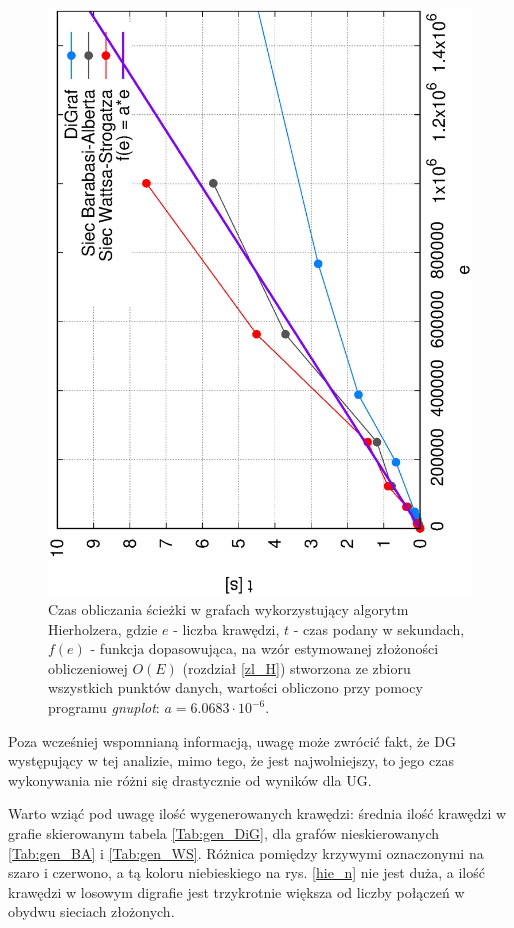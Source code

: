 \documentclass[a4paper, 12pt, twoside, openright]{article}
\begin{document}
\begin{figure}[h]
	\centering
	\includegraphics[angle=270,width=1\textwidth]{img/wyniki/Hierholzer_e}
	\caption[]{Czas obliczania ścieżki w grafach wykorzystujący algorytm Hierholzera, gdzie $e$ - liczba krawędzi, $t$ - czas podany w sekundach, $f(e)$ - funkcja dopasowująca, na wzór estymowanej złożoności obliczeniowej $O(E)$ (rozdział \ref{zl_H}) stworzona ze zbioru wszystkich punktów danych, wartości obliczono przy pomocy programu \textit{gnuplot}: $a = 6.0683 \cdot 10^{-6}$.}
	\label{hie_e}
\end{figure}

	Poza wcześniej wspomnianą informacją, uwagę może zwrócić fakt, że DG występujący w tej analizie, mimo tego, że jest najwolniejszy, to jego czas wykonywania nie różni się drastycznie od wyników dla UG. 
	
	Warto wziąć pod uwagę ilość wygenerowanych krawędzi: średnia ilość krawędzi w grafie skierowanym tabela \ref{Tab:gen_DiG}, dla grafów nieskierowanych \ref{Tab:gen_BA} i \ref{Tab:gen_WS}. Różnica pomiędzy krzywymi oznaczonymi na szaro i czerwono, a tą koloru niebieskiego na rys. \ref{hie_n} nie jest duża, a ilość krawędzi w losowym digrafie jest trzykrotnie większa od liczby połączeń w obydwu sieciach złożonych.
\end{document}
